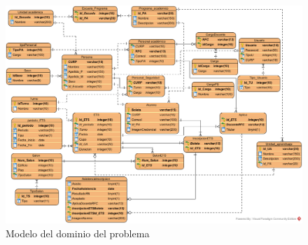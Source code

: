 \begin{figure}[htbp!]
	\begin{center}
		\includegraphics[angle=90,width=.70\textwidth]{images/DER}
		\caption{Modelo del dominio del problema}
		\label{fig:modeloDeDominio}
	\end{center}
\end{figure}

